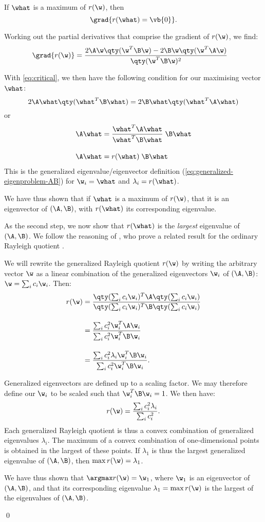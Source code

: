If $\what$ is a maximum of $r(\w)$, then
\begin{equation}
\label{eq:critical}
\grad{r(\what) = \vb{0}}.
\end{equation}

Working out the partial derivatives that comprise the gradient of $r(\w)$, we find:
\begin{align*}
\grad{r(\w)} &= \frac{2 \A \w \qty(\w^T \B \w) 
                      - 2 \B \w \qty(\w^T \A \w)}
                     {\qty(\w^T \B \w)^2}
\end{align*}

With \cref{eq:critical}, we then have the following condition for our maximising vector $\what$:
\[
2 \A \what \qty(\what^T \B \what) = 2 \B \what \qty(\what^T \A \what)
\]
or
\begin{align*}
\A \what &= \frac{\what^T \A \what}
                 {\what^T \B \what} \; \B \what  \\[1em]
\A \what &= r(\what) \; \B \what
\end{align*}
This is the generalized eigenvalue/eigenvector definition (\cref{eq:generalized-eigenproblem-AB}) for $\w_i = \what$ and $\lambda_i = r(\what)$.

We have thus shown that if $\what$ is a maximum of $r(\w)$, that it is an eigenvector of $(\A,\B)$, with $r(\what)$ its corresponding eigenvalue.

As the second step, we now show that $r(\what)$ is the \emph{largest} eigenvalue of $(\A,\B)$. We follow the reasoning of \citeauthor{Trefethen1997}, who prove a related result for the ordinary Rayleigh quotient \cite[p. 204]{Trefethen1997}.

We will rewrite the generalized Rayleigh quotient $r(\w)$ by writing the arbitrary vector $\w$ as a linear combination of the generalized eigenvectors $\w_i$ of $(\A,\B)$: $\w = \sum_i c_i \w_i$. Then:
\begin{align*}
r(\w) &= \frac{\qty(\sum_i c_i \w_i)^T \A \qty(\sum_i c_i \w_i)}
              {\qty(\sum_i c_i \w_i)^T \B \qty(\sum_i c_i \w_i)} \\[1em]
      &= \frac{\sum_i c_i^2 \w_i^T \A \w_i}
              {\sum_i c_i^2 \w_i^T \B \w_i} \\[1em]
      &= \frac{\sum_i c_i^2 \lambda_i \w_i^T \B \w_i}
              {\sum_i c_i^2 \w_i^T \B \w_i}.
\end{align*}

Generalized eigenvectors are defined up to a scaling factor. We may therefore define our $\w_i$ to be scaled such that $\w_i^T \B \w_i = 1$. We then have:
\[
r(\w) = \frac{\sum_i c_i^2 \lambda_i}{\sum_i c_i^2}.
\]
%
Each generalized Rayleigh quotient is thus a convex combination of generalized eigenvalues $\lambda_i$. The maximum of a convex combination of one-dimensional points is obtained in the largest of these points. If $\lambda_1$ is thus the largest generalized eigenvalue of $(\A,\B)$, then $\max{r(\w)} = \lambda_1$.

We have thus shown that $\argmax r(\w) = \w_1$, where $\w_1$ is an eigenvector of $(\A,\B)$, and that its corresponding eigenvalue $\lambda_1 = \max r(\w)$ is the largest of the eigenvalues of $(\A,\B)$.

\qed
